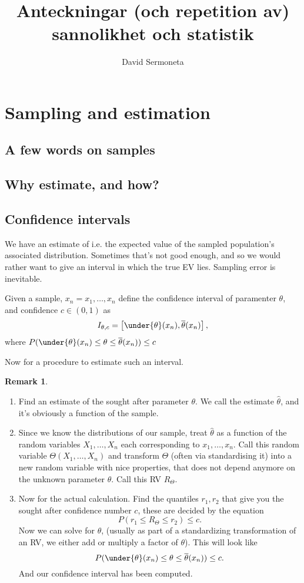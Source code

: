\documentclass{article}
\title{Anteckningar (och repetition av) sannolikhet och statistik}
\author{David Sermoneta}
\theoremstyle{definition}
\newtheorem*{remark}{Remark}
\theoremstyle{definition}
\theoremstyle{definition}
\theoremstyle{definition}
\begin{document}
\maketitle

\section*{Sampling and estimation}

\subsection*{A few words on samples}

\subsection*{Why estimate, and how?}

\subsection*{Confidence intervals}
We have an estimate of i.e. the expected value of the sampled population's
associated distribution. Sometimes that's not good enough, and so we would
rather want to give an interval in which the true EV lies. Sampling error is 
inevitable.

\begin{definition} 
Given a sample, $x_{n} = x_1,\ldots,x_{n}$ define the
confidence interval of paramenter $\theta$, and confidence $c \in  (0,1)$ as \[
 I_{\theta, c} = \left[ \under{\theta}(x_{n}) , \overline{\theta}(x_{n}) \right],
 \]  where $P(\under{\theta}(x_{n}) \leq  \theta \leq  \overline{\theta}(x_{n}) ) \leq  c$
\end{definition}
Now for a procedure to estimate such an interval.
\begin{remark}
 \;
\begin{enumerate}[(1)]
\item Find an estimate of the sought after parameter $\theta.$ We call the estimate
$\hat{\theta}$, and it's obviously a function of the sample.
\item Since we know the distributions of our sample, treat  $\hat{\theta}$ as a
function of the random variables $X_1,\ldots,X_{n}$ each corresponding to
$x_1,\ldots,x_{n}$. Call this random variable $\Theta(X_1, \ldots,X_{n})$ and
 transform $\Theta$ (often via standardising it) into a new random variable with nice properties, that does not depend anymore on the unknown parameter  $\theta$. Call this RV $R_{\Theta}$. 
\item Now for the actual calculation. Find the quantiles $r_1, r_2$ that give you the sought after confidence number $c$, these are decided by the equation \[
P(r_1 \leq  R_{\Theta} \leq  r_2) \leq  c.
\]  Now we can solve for $\theta$, (usually as part of a standardizing transformation of an RV, we either add or multiply a factor of  $\theta$). This will look like \[
P(\under{\theta}(x_{n}) \leq  \theta \leq  \overline{\theta}(x_{n})) \leq  c.
\] And our confidence interval has been computed.
\end{enumerate}
\end{remark}
\end{document}
